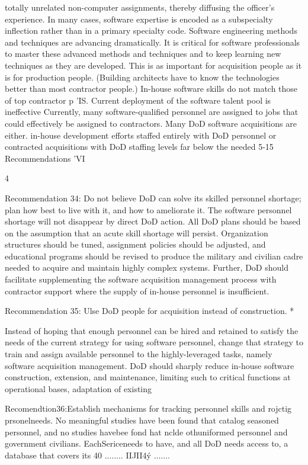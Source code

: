 \documentclass[12pt]{article}
\begin{document}
totally unrelated non-computer assignments, thereby diffusing the officer's experience. In
many cases, software expertise is encoded as a subspecialty inflection rather than in a
primary specialty code.
Software engineering methods and techniques are advancing dramatically. It is critical
for software professionals to master these advanced methods and techniques and to keep
learning new techniques as they are developed. This is as important for acquisition people
as it is for production people. (Building architects have to know the technologies better
than most contractor people.) In-house software skills do not match those of top contractor
p 'IS.
Current deployment of the software talent pool is ineffective
Currently, many software-qualified personnel are assigned to jobs that could effectively be assigned to contractors. Many DoD software acquisitions are either. in-house
development efforts staffed entirely with DoD personnel or contracted acquisitions with
DoD staffing levels far below the needed 5-15%
Recommendations
'VI

4

Recommendation 34: Do not believe DoD can solve its skilled personnel
shortage; plan how best to live with it, and how to ameliorate it.
The software personnel shortage will not disappear by direct DoD action. All DoD
plans should be based on the assumption that an acute skill shortage will persist.
Organization structures should be tuned, assignment policies should be adjusted, and
educational programs should be revised to produce the military and civilian cadre needed
to acquire and maintain highly complex systems.
Further, DoD should facilitate supplementing the software acquisition management
process with contractor support where the supply of in-house personnel is insufficient.

Recommendation 35: Ulse DoD people for acquisition instead of construction.
*

Instead of hoping that enough personnel can be hired and retained to satisfy the
needs of the current strategy for using software personnel, change that strategy to train
and assign available personnel to the highly-leveraged tasks, namely software acquisition
management. DoD should sharply reduce in-house software construction, extension, and
maintenance, limiting such to critical functions at operational bases, adaptation of existing

Recomendtion36:Establish mechanisms for tracking personnel skills
and rojctig prsonelneeds.
No meaningful studies have been found that catalog seasoned personnel, and no studies
havebee
fond hat nclde othuniformed personnel and government civilians.
EachSericeneeds to have, and all DoD needs access to, a database that covers its
40
........ IIJII4ý
.......
\end{document}
